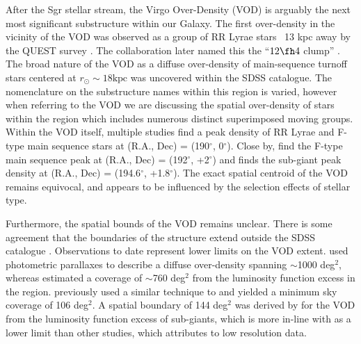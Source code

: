 \documentclass{emulateapj}
\begin{document}
	After the Sgr stellar stream, the Virgo Over-Density (VOD) is arguably the next most significant substructure within our Galaxy. The first over-density in the vicinity of the VOD was observed as a group of RR Lyrae stars ~13 kpc away by the QUEST survey \citep{Vivas;et-al_2001}. The collaboration later named this the ``$12\fh4$ clump'' \citep{Zinn;et-al_2004}. The broad nature of the VOD as a diffuse over-density of main-sequence turnoff stars centered at $r_\odot \sim18 \text{kpc}$ \citep[which ][dubbed as S297+63-20.5]{Newberg;et-al_2002} was uncovered within the SDSS catalogue. The nomenclature on the substructure names within this region is varied, however when referring to the VOD we are discussing the spatial over-density of stars within the region which includes numerous distinct superimposed moving groups. Within the VOD itself, multiple studies find a peak density of RR Lyrae \citep{Vivas;et-al_2001, Ivezic;et-al_2005} and F-type main sequence stars \citep{Newberg;et-al_2002} at (R.A., Dec) = (190$^\circ$, 0$^\circ$). Close by, \citet{Juric;et-al_2008} find the F-type main sequence peak at (R.A., Dec) = (192$^\circ$, +2$^\circ$) and \citet{Keller_2010} finds the sub-giant peak density at (R.A., Dec) = (194.6$^\circ$, +1.8$^\circ$). The exact spatial centroid of the VOD remains equivocal, and appears to be influenced by the selection effects of stellar type.	
	
	
	
	Furthermore, the spatial bounds of the VOD remains unclear. There is some agreement that the boundaries of the structure extend outside the SDSS catalogue \citep{Newberg;et-al_2007,Prior;et-al_2009a,Keller;et-al_2009}. Observations to date represent lower limits on the VOD extent.\citet{Juric;et-al_2008} used photometric parallaxes to describe a diffuse over-density spanning $\sim$1000 deg$^2$, whereas \citet{Prior;et-al_2009a} estimated a coverage of $\sim$760 deg$^2$ from the luminosity function excess in the region. \citet{Duffau;et-al_2006} previously used a similar technique to \citet{Prior;et-al_2009a} and yielded a minimum sky coverage of 106 deg$^2$. A spatial boundary of 144 deg$^2$ was derived by \citet{Keller_2010} for the VOD from the luminosity function excess of sub-giants, which is more in-line with \citet{Duffau;et-al_2006} as a lower limit than other studies, which \citet{Keller_2010} attributes to low resolution data. 
	
\end{document}
